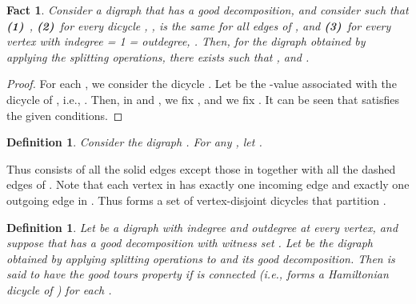 \documentclass[11pt]{article}
\newtheorem{definition}[theorem]{Definition}
\newtheorem{fact}[theorem]{Fact}
\begin{document}
\begin{fact}\label{fact:CorrectDeg}
Consider a digraph  that has a good decomposition, and consider
 such that
\textbf{(1)}~, \quad
\textbf{(2)}~for every dicycle , ,
	 is the same for all edges  of , and \quad
\textbf{(3)}~for every vertex  with indegree = 1 = outdegree,
.
Then, for the digraph  obtained by
applying the splitting operations, there exists
 such that
, and
.
\end{fact}
\begin{proof}
For each , we consider the dicycle .
Let  be the -value associated with the dicycle  of ,
i.e., .
Then, in  and ,
we fix , and
we fix .
It can be seen that  satisfies the given conditions.
\end{proof}


\begin{definition}
Consider the digraph .
For any , let .
\end{definition}


Thus 
consists of all the solid edges except those in  together with
all the dashed edges of .
Note that each vertex in  has exactly one incoming edge and
exactly one outgoing edge in . Thus  forms a set of
vertex-disjoint dicycles that partition .


\begin{definition}
\label{def:nicedigraph}
Let  be a digraph with indegree and outdegree 
at every vertex, and suppose that  has a good decomposition
with witness set .
Let  be the digraph obtained by applying splitting operations
to  and its good decomposition.
Then  is said to have the \textit{good tours} property if
 is connected
(i.e.,  forms a Hamiltonian dicycle of )
for each .
\end{definition}
\end{document}
